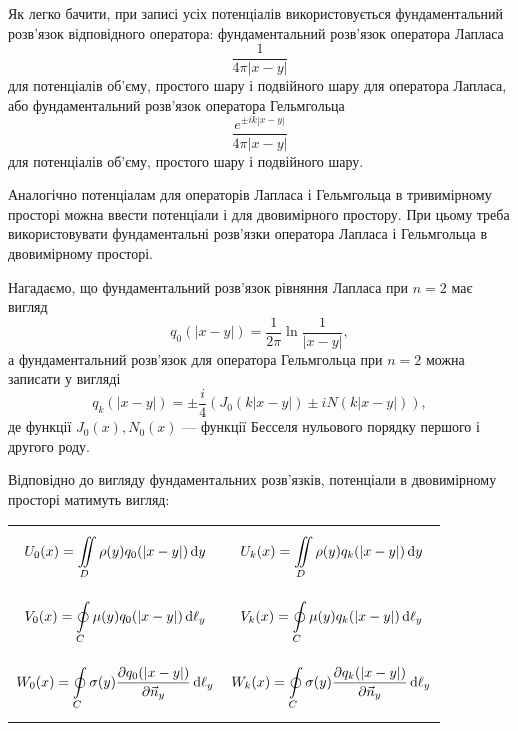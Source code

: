 Як легко бачити, при записі усіх потенціалів використовується фундаментальний розв'язок відповідного оператора: фундаментальний розв'язок оператора Лапласа
\begin{equation}
	\frac{1}{4 \pi |x - y|}
\end{equation}
для потенціалів об'єму, простого шару і подвійного шару для оператора Лапласа, або фундаментальний розв'язок оператора Гельмгольца
\begin{equation}
	\frac{e^{\pm i k |x - y|}}{4 \pi |x - y|}	
\end{equation}
для потенціалів об'єму, простого шару і подвійного шару. \medskip

Аналогічно потенціалам для операторів Лапласа і Гельмгольца в тривимірному просторі можна ввести потенціали і для двовимірного простору. При цьому треба використовувати фундаментальні розв'язки оператора Лапласа і Гельмгольца в двовимірному просторі. \medskip

Нагадаємо, що фундаментальний розв'язок рівняння Лапласа при $n = 2$ має вигляд
\begin{equation}
	q_0(|x - y|) = \frac{1}{2 \pi} \ln \frac{1}{|x - y|},
\end{equation}
а фундаментальний розв'язок для оператора Гельмгольца при $n = 2$ можна записати у вигляді 
\begin{equation}
	\label{eq:4.8.4}
	q_k (|x - y|) = \pm \frac{i}{4} \left( J_0(k |x - y|) \pm i N(k |x - y|) \right),
\end{equation}
де функції $J_0(x), N_0(x)$ --- функції Бесселя нульового порядку першого і другого роду.  \medskip

Відповідно до вигляду фундаментальних розв'язків, потенціали в двовимірному просторі матимуть вигляд:
\begin{longtable}{p{} p{}}
	\parbox{.5\textwidth}{\begin{equation}
		\label{eq:4.8.5}
		U_0(x) = \displaystyle\iint\limits_D \rho(y) q_0(|x - y|) \mathop{}\!\mathrm{d} y
	\end{equation}} & \parbox{.5\textwidth}{\begin{equation}
		\label{eq:4.8.5'}
		U_k(x) = \displaystyle\iint\limits_D \rho(y) q_k(|x - y|) \mathop{}\!\mathrm{d} y
	\end{equation}} \\
	\parbox{.5\textwidth}{\begin{equation}
		\label{eq:4.8.6}
		V_0(x) = \displaystyle\oint\limits_C \mu(y) q_0(|x - y|) \mathop{}\!\mathrm{d} \ell_y
	\end{equation}} & \parbox{.5\textwidth}{\begin{equation}
		\label{eq:4.8.6'}
		V_k(x) = \displaystyle\oint\limits_C \mu(y) q_k(|x - y|) \mathop{}\!\mathrm{d} \ell_y
	\end{equation}} \\
	\parbox{.5\textwidth}{\begin{equation}
		\label{eq:4.8.7}
		W_0(x) = \displaystyle\oint\limits_C \sigma(y) \frac{\partial q_0(|x - y|)}{\partial \vec n_y} \mathop{}\!\mathrm{d} \ell_y
	\end{equation}} & \parbox{.5\textwidth}{\begin{equation}
		\label{eq:4.8.7'}
		W_k(x) = \displaystyle\oint\limits_C \sigma(y) \frac{\partial q_k(|x - y|)}{\partial \vec n_y} \mathop{}\!\mathrm{d} \ell_y
	\end{equation}}
\end{longtable}


